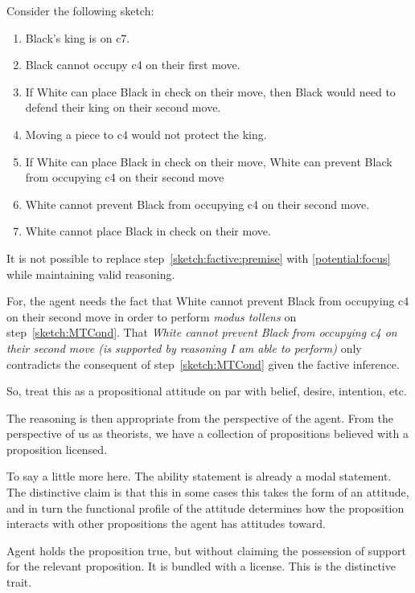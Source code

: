 \documentclass[10pt]{article}
\begin{document}
Consider the following sketch:

\begin{enumerate}
\item Black's king is on c7.
\item Black cannot occupy c4 on their first move.
\item If White can place Black in check on their move, then Black would need to defend their king on their second move.
\item Moving a piece to c4 would not protect the king.
\item\label{sketch:MTCond} If White can place Black in check on their move, White can prevent Black from occupying c4 on their second move
\item\label{sketch:factive:premise} White cannot prevent Black from occupying c4 on their second move.
\item\label{sketch:conclusion} White cannot place Black in check on their move.
\end{enumerate}

It is not possible to replace step~\ref{sketch:factive:premise} with \ref{potential:focus} while maintaining valid reasoning.

For, the agent needs the fact that White cannot prevent Black from occupying c4 on their second move in order to perform \emph{modus tollens} on step~\ref{sketch:MTCond}.
That \emph{White cannot prevent Black from occupying c4 on their second move (is supported by reasoning I am able to perform)} only contradicts the consequent of step~\ref{sketch:MTCond} given the factive inference.



So, treat this as a propositional attitude on par with belief, desire, intention, etc.



The reasoning is then appropriate from the perspective of the agent.
From the perspective of us as theorists, we have a collection of propositions believed with a proposition licensed.


To say a little more here.
The ability statement is already a modal statement.
The distinctive claim is that this in some cases this takes the form of an attitude, and in turn the functional profile of the attitude determines how the proposition interacts with other propositions the agent has attitudes toward.


Agent holds the proposition true, but without claiming the possession of support for the relevant proposition.
It is bundled with a license.
This is the distinctive trait.
\end{document}
